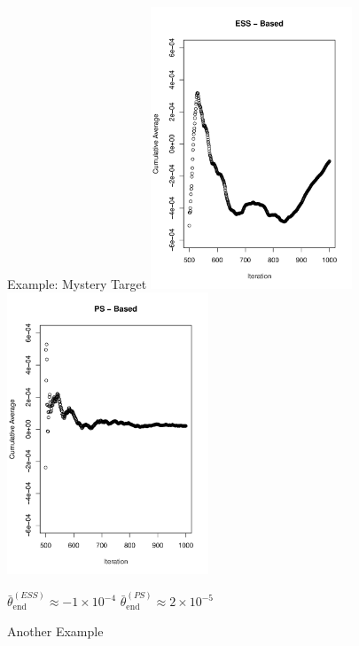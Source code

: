 \documentclass[14pt]{beamer}
\begin{document}
\begin{frame}{Example: Mystery Target}
    \centering
    \includegraphics[height=0.7\textheight, width=0.45\textwidth]{Figures/ESS mean traj.pdf}%
    \includegraphics[height=0.7\textheight, width=0.45\textwidth]{Figures/PS mean traj.pdf} \newline
    \begin{outline}
        $\bar{\theta}_\mathrm{end}^{(ESS)} \approx -1 \times 10^{-4}$ \hspace{1.5cm} $\bar{\theta}_\mathrm{end}^{(PS)} \approx 2 \times 10^{-5}$
    \end{outline}
\end{frame}

\begin{frame}{Another Example}
    \begin{outline}
        \1 
    \end{outline}
\end{frame}
\end{document}
